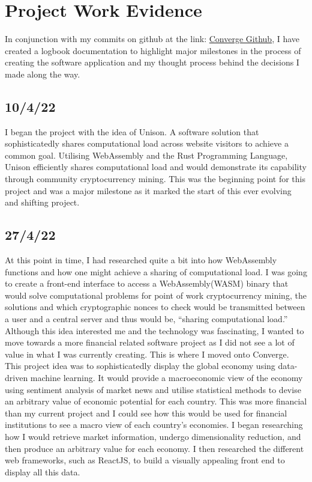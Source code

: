 \let\textcircled=\pgftextcircled
\chapter{Project Work Evidence}
In conjunction with my commits on github at the link: \href{https://github.com/alexjgreig/converge}{Converge Github}, I have created a logbook documentation to highlight major milestones in the process of creating the software application and my thought process behind the decisions I made along the way. \\

\section{10/4/22}
I began the project with the idea of Unison. A software solution that sophisticatedly shares computational load across website visitors to achieve a common goal. Utilising WebAssembly and the Rust Programming Language, Unison efficiently shares computational load and would demonstrate its capability through community cryptocurrency mining. This was the beginning point for this project and was a major milestone as it marked the start of this ever evolving and shifting project. \\
\section{27/4/22}
At this point in time, I had researched quite a bit into how WebAssembly functions and how one might achieve a sharing of computational load. I was going to create a front-end interface to access a WebAssembly(WASM) binary that would solve computational problems for point of work cryptocurrency mining, the solutions and which cryptographic nonces to check would be transmitted between a user and a central server and thus would be, “sharing computational load.” Although this idea interested me and the technology was fascinating, I wanted to move towards a more financial related software project as I did not see a lot of value in what I was currently creating. This is where I moved onto Converge. This project idea was to sophisticatedly display the global economy using data-driven machine learning. It would provide a macroeconomic view of the economy using sentiment analysis of market news and utilise statistical methods to devise an arbitrary value of economic potential for each country. This was more financial than my current project and I could see how this would be used for financial institutions to see a macro view of each country’s economies. I began researching how I would retrieve market information, undergo dimensionality reduction, and then produce an arbitrary value for each economy. I then researched the different web frameworks, such as ReactJS, to build a visually appealing front end to display all this data. \\
